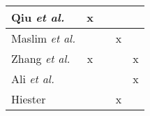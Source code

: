 \begin{table}[!ht]
\begin{tabular}{l|c|c|c|c}
Qiu \textit{et al.} \cite{qiu_new_2014}                  & x      &        &      &       \\ \hline
Maslim \textit{et al.} \cite{maslim_distributed_2014}       &        &        & x    &       \\ \hline
Zhang \textit{et al.} \cite{zhang_svm_2016}                & x      &        &      & x      \\ \hline
Ali \textit{et al.} \cite{ali_classification_2018}       &        &        &      & x     \\ \hline
Hiester \cite{hiester_file_2018}             &        &        & x    &       \\ %
\end{tabular}
\end{table}